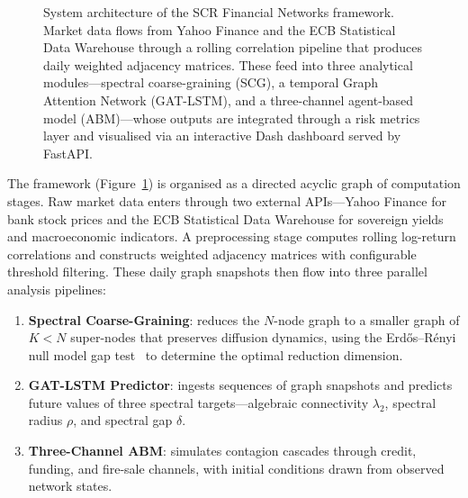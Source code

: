 \begin{figure}[H]
    \caption{System architecture of the SCR Financial Networks framework. Market data flows from Yahoo Finance and the ECB Statistical Data Warehouse through a rolling correlation pipeline that produces daily weighted adjacency matrices. These feed into three analytical modules---spectral coarse-graining (SCG), a temporal Graph Attention Network (GAT-LSTM), and a three-channel agent-based model (ABM)---whose outputs are integrated through a risk metrics layer and visualised via an interactive Dash dashboard served by FastAPI.}
    \label{fig:architecture}
\end{figure}

The framework (Figure~\ref{fig:architecture}) is organised as a directed acyclic graph of computation stages. Raw market data enters through two external APIs---Yahoo Finance for bank stock prices and the ECB Statistical Data Warehouse for sovereign yields and macroeconomic indicators. A preprocessing stage computes rolling log-return correlations and constructs weighted adjacency matrices with configurable threshold filtering. These daily graph snapshots then flow into three parallel analysis pipelines:

\begin{enumerate}[label=(\roman*)]
    \item \textbf{Spectral Coarse-Graining}: reduces the $N$-node graph to a smaller graph of $K < N$ super-nodes that preserves diffusion dynamics, using the Erd\H{o}s--R\'{e}nyi null model gap test~\cite{schmidt2024spectral} to determine the optimal reduction dimension.
    \item \textbf{GAT-LSTM Predictor}: ingests sequences of graph snapshots and predicts future values of three spectral targets---algebraic connectivity $\lambda_2$, spectral radius $\rho$, and spectral gap $\delta$.
    \item \textbf{Three-Channel ABM}: simulates contagion cascades through credit, funding, and fire-sale channels, with initial conditions drawn from observed network states.
\end{enumerate}

